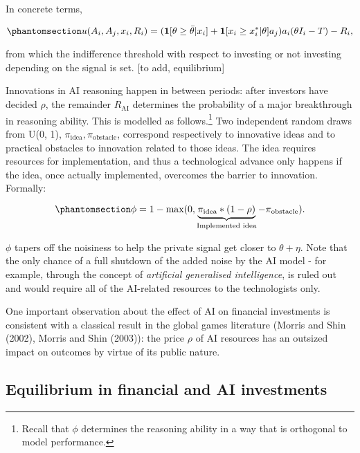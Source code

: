 \documentclass[
]{article}
\theoremstyle{definition}
\theoremstyle{plain}
\theoremstyle{remark}
\begin{document}
In concrete terms,

\begin{equation}\phantomsection\label{eq-utility}{
u(A_i, A_j, x_i, R_i) = (\mathbf{1}[\theta \geq \bar{\theta}|x_i] + \mathbf{1}[x_i \geq x_i^*|\theta]a_j)a_i(\theta I_i - T) - R_i,
}\end{equation}

from which the indifference threshold with respect to investing or not
investing depending on the signal is set. {[}to add, equilibrium{]}

Innovations in AI reasoning happen in between periods: after investors
have decided \(\rho\), the remainder \(R_{\text{AI}}\) determines the
probability of a major breakthrough in reasoning ability. This is
modelled as follows.\footnote{Recall that \(\phi\) determines the
  reasoning ability in a way that is orthogonal to model performance.}
Two independent random draws from U(0, 1),
\(\pi_{\text{idea}}, \pi_{\text{obstacle}}\), correspond respectively to
innovative ideas and to practical obstacles to innovation related to
those ideas. The idea requires resources for implementation, and thus a
technological advance only happens if the idea, once actually
implemented, overcomes the barrier to innovation. Formally:

\begin{equation}\phantomsection\label{eq-tech}{
\phi = 1-\text{max}(0, \underbrace{\pi_{\text{idea}} * (1-\rho)}_{\text{Implemented idea}} - \pi_{\text{obstacle}}).
}\end{equation}

\(\phi\) tapers off the noisiness to help the private signal get closer
to \(\theta + \eta\). Note that the only chance of a full shutdown of
the added noise by the AI model - for example, through the concept of
\emph{artificial generalised intelligence}, is ruled out and would
require all of the AI-related resources to the technologists only.

One important observation about the effect of AI on financial
investments is consistent with a classical result in the global games
literature (Morris and Shin (2002), Morris and Shin (2003)): the price
\(\rho\) of AI resources has an outsized impact on outcomes by virtue of
its public nature.

\subsection{Equilibrium in financial and AI
investments}\label{equilibrium-in-financial-and-ai-investments}
\end{document}
